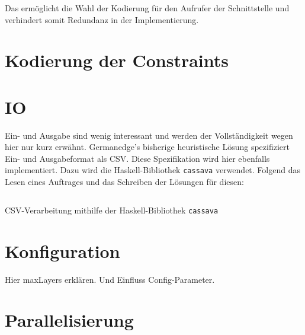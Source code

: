 Das ermöglicht die Wahl der Kodierung für den Aufrufer der Schnittstelle und verhindert somit Redundanz in der Implementierung.

\section{Kodierung der Constraints}
\label{sec:kodierungconstraints}

\section{IO}
Ein- und Ausgabe sind wenig interessant und werden der Vollständigkeit wegen hier nur kurz erwähnt.
Germanedge's bisherige heuristische Lösung spezifiziert Ein- und Ausgabeformat als CSV.
Diese Spezifikation wird hier ebenfalls implementiert.
Dazu wird die Haskell-Bibliothek \texttt{cassava} \cite{cassava} verwendet.
Folgend das Lesen eines Auftrages und das Schreiben der Lösungen für diesen:

\begin{listing}[H]
    \inputminted[linenos=true]{haskell}{Code/Implementierung/CassavaImport.hs}
    \caption{CSV-Verarbeitung mithilfe der Haskell-Bibliothek \texttt{cassava}}
    \label{listing:cassavaimport}
\end{listing}

\section{Konfiguration}
Hier maxLayers erklären.
Und Einfluss Config-Parameter.

\section{Parallelisierung}